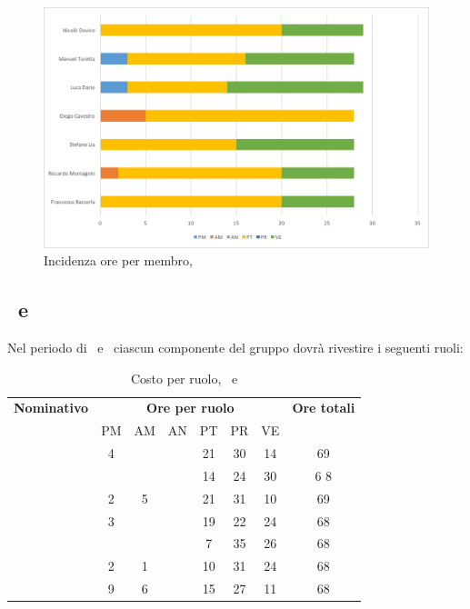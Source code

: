 \begin{figure}[H]
	\centering 
	\includegraphics[scale=0.7]{Immagini/GraficiPianoLavoro/PA.png}
	\caption{Incidenza ore per membro, \PA}
\end{figure}

\newpage
\subsection{\PD\ e \COD}
Nel periodo di \PD\ e \COD\ ciascun componente del gruppo dovrà rivestire i seguenti ruoli:

\begin{table}[h]
	\begin{center}
		\begin{tabular}{|c|c|c|c|c|c|c|c|}
			\hline
			\textbf{Nominativo} & \multicolumn{6}{c|}{\textbf{Ore per ruolo}} & \textbf{Ore totali} \\
					& PM & AM & AN & PT & PR & VE & \\
			\hline
			\FB		& 4  &	  &   & 21	&	30 & 14  &	69	\\
			\hline
			\RM		&	 &	  &	   & 14	&	24 & 30 & 6	8\\
			\hline
			\SL		& 2	 & 5  &	   & 21	&	31 & 10  &	69	\\
			\hline
			\DC		& 3	 &	  &	   & 19	&	22 & 24 &	68	\\
			\hline
			\LD 	&	 &	  &	   & 7	&	35 & 26  &	68	\\
			\hline
			\MT		& 	2 & 1  &	   & 10	&	31 & 24  &	68	\\
			\hline
			\ND 	& 9 & 6  &	   & 15	&	27 & 11 & 68	\\
			\hline
		\end{tabular}
	\end{center}
	\caption{Costo per ruolo, \PD\ e \COD}
\end{table}

